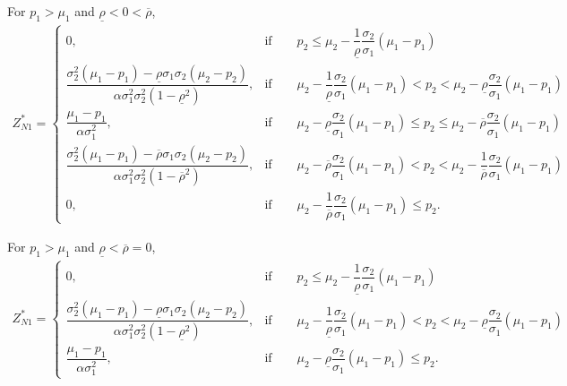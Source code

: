 \documentclass[10pt]{article}
\begin{document}
For $ p_1 > \mu_1 $ and $ \underline{\rho} < 0 < \overline{\rho} $,
{\footnotesize \begin{eqnarray}
Z_{N 1}^* = \left\{ \begin{matrix}
0, & \text{if} \qquad p_2 \leqslant \mu_2 - \dfrac1{\underline{\rho}} \dfrac{\sigma_2}{\sigma_1} (\mu_1 - p_1) \\
\dfrac{\sigma_2^2 (\mu_1 - p_1) - \underline{\rho} \sigma_1 \sigma_2 (\mu_2 - p_2)}{\alpha \sigma_1^2 \sigma_2^2 (1 - \underline{\rho}^2)}, & \text{if} \qquad \mu_2 - \dfrac1{\underline{\rho}} \dfrac{\sigma_2}{\sigma_1} (\mu_1 - p_1) < p_2 < \mu_2 - \underline{\rho} \dfrac{\sigma_2}{\sigma_1} (\mu_1 - p_1) \\
\dfrac{\mu_1 - p_1}{\alpha \sigma_1^2}, & \text{if} \qquad \mu_2 - \underline{\rho} \dfrac{\sigma_2}{\sigma_1} (\mu_1 - p_1) \leqslant p_2 \leqslant \mu_2 - \overline{\rho} \dfrac{\sigma_2}{\sigma_1} (\mu_1 - p_1) \\
\dfrac{\sigma_2^2 (\mu_1 - p_1) - \overline{\rho} \sigma_1 \sigma_2 (\mu_2 - p_2)}{\alpha \sigma_1^2 \sigma_2^2 (1 - \overline{\rho}^2)}, & \text{if} \qquad \mu_2 - \overline{\rho} \dfrac{\sigma_2}{\sigma_1} (\mu_1 - p_1) < p_2 < \mu_2 - \dfrac1{\overline{\rho}} \dfrac{\sigma_2}{\sigma_1} (\mu_1 - p_1) \\
0, & \text{if} \qquad \mu_2 - \dfrac1{\overline{\rho}} \dfrac{\sigma_2}{\sigma_1} (\mu_1 - p_1) \leqslant p_2.
\end{matrix} \right.
\end{eqnarray}}

For $ p_1 > \mu_1 $ and $ \underline{\rho} < \overline{\rho} = 0 $,
{\footnotesize \begin{eqnarray}
Z_{N 1}^* = \left\{ \begin{matrix}
0, & \text{if} \qquad p_2 \leqslant \mu_2 - \dfrac1{\underline{\rho}} \dfrac{\sigma_2}{\sigma_1} (\mu_1 - p_1) \\
\dfrac{\sigma_2^2 (\mu_1 - p_1) - \underline{\rho} \sigma_1 \sigma_2 (\mu_2 - p_2)}{\alpha \sigma_1^2 \sigma_2^2 (1 - \underline{\rho}^2)}, & \text{if} \qquad \mu_2 - \dfrac1{\underline{\rho}} \dfrac{\sigma_2}{\sigma_1} (\mu_1 - p_1) < p_2 < \mu_2 - \underline{\rho} \dfrac{\sigma_2}{\sigma_1} (\mu_1 - p_1) \\
\dfrac{\mu_1 - p_1}{\alpha \sigma_1^2}, & \text{if} \qquad \mu_2 - \underline{\rho} \dfrac{\sigma_2}{\sigma_1} (\mu_1 - p_1) \leqslant p_2.
\end{matrix} \right.
\end{eqnarray}}
\end{document}
